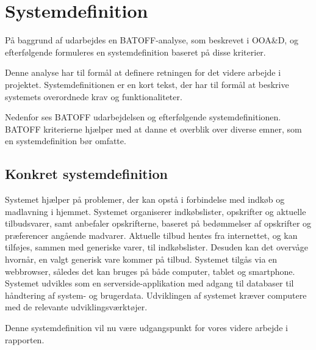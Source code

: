 \section{Systemdefinition}
På baggrund af  udarbejdes en BATOFF-analyse, som beskrevet i OOA\&D\citep{OOA&D2001}, og efterfølgende formuleres en systemdefinition baseret på disse kriterier.

Denne analyse har til formål at definere retningen for det videre arbejde i projektet.
Systemdefinitionen er en kort tekst, der har til formål at beskrive systemets overordnede krav og funktionaliteter.

Nedenfor ses BATOFF udarbejdelsen og efterfølgende systemdefinitionen.
BATOFF kriterierne hjælper med at danne et overblik over diverse emner, som en systemdefinition bør omfatte.




\subsection{Konkret systemdefinition}\label{Sysdef}

Systemet hjælper på problemer, der kan opstå i forbindelse med indkøb og madlavning i hjemmet.
Systemet organiserer indkøbslister, opskrifter og aktuelle tilbudsvarer, samt anbefaler opskrifterne, baseret på bedømmelser af opskrifter og præferencer angående madvarer.
Aktuelle tilbud hentes fra internettet, og kan tilføjes, sammen med generiske varer, til indkøbslister.
Desuden kan det overvåge hvornår, en valgt generisk vare kommer på tilbud.
Systemet tilgås via en webbrowser, således det kan bruges på både computer, tablet og smartphone.
Systemet udvikles som en serverside-applikation med adgang til databaser til håndtering af system- og brugerdata.
Udviklingen af systemet kræver computere med de relevante udviklingsværktøjer.

Denne systemdefinition vil nu være udgangspunkt for vores videre arbejde i rapporten.
